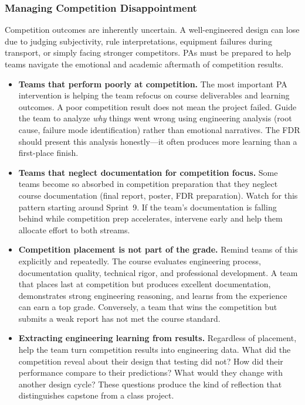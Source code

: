 \subsubsection{Managing Competition Disappointment}

Competition outcomes are inherently uncertain. A well-engineered design can lose due to judging subjectivity, rule interpretations, equipment failures during transport, or simply facing stronger competitors. PAs must be prepared to help teams navigate the emotional and academic aftermath of competition results.

\begin{itemize}[nosep,leftmargin=1.5em]
\item \textbf{Teams that perform poorly at competition.} The most important PA intervention is helping the team refocus on course deliverables and learning outcomes. A poor competition result does not mean the project failed. Guide the team to analyze \emph{why} things went wrong using engineering analysis (root cause, failure mode identification) rather than emotional narratives. The FDR should present this analysis honestly---it often produces more learning than a first-place finish.

\item \textbf{Teams that neglect documentation for competition focus.} Some teams become so absorbed in competition preparation that they neglect course documentation (final report, poster, FDR preparation). Watch for this pattern starting around Sprint~9. If the team's documentation is falling behind while competition prep accelerates, intervene early and help them allocate effort to both streams.

\item \textbf{Competition placement is not part of the grade.} Remind teams of this explicitly and repeatedly. The course evaluates engineering process, documentation quality, technical rigor, and professional development. A team that places last at competition but produces excellent documentation, demonstrates strong engineering reasoning, and learns from the experience can earn a top grade. Conversely, a team that wins the competition but submits a weak report has not met the course standard.

\item \textbf{Extracting engineering learning from results.} Regardless of placement, help the team turn competition results into engineering data. What did the competition reveal about their design that testing did not? How did their performance compare to their predictions? What would they change with another design cycle? These questions produce the kind of reflection that distinguishes capstone from a class project.
\end{itemize}

